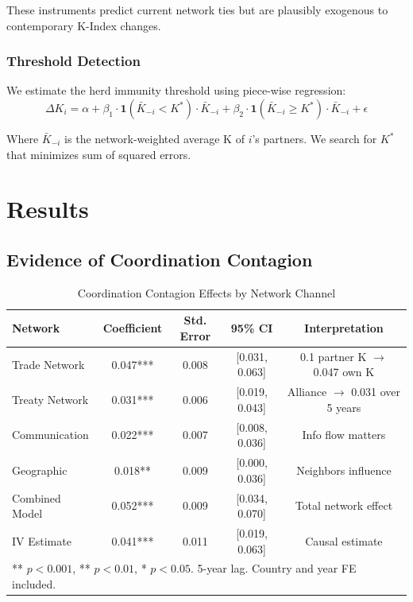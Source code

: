 \documentclass[12pt,a4paper]{article}
\begin{document}
These instruments predict current network ties but are plausibly exogenous to contemporary K-Index changes.

\subsubsection{Threshold Detection}

We estimate the herd immunity threshold using piece-wise regression:
\begin{equation}
\Delta K_i = \alpha + \beta_1 \cdot \mathbf{1}(\bar{K}_{-i} < K^*) \cdot \bar{K}_{-i} + \beta_2 \cdot \mathbf{1}(\bar{K}_{-i} \geq K^*) \cdot \bar{K}_{-i} + \epsilon
\end{equation}

Where $\bar{K}_{-i}$ is the network-weighted average K of $i$'s partners. We search for $K^*$ that minimizes sum of squared errors.

\section{Results}
\label{sec:results}

\subsection{Evidence of Coordination Contagion}

\begin{table}[H]
\centering
\caption{Coordination Contagion Effects by Network Channel}
\label{tab:contagion}
\begin{tabular}{lcccc}
\toprule
\textbf{Network} & \textbf{Coefficient} & \textbf{Std. Error} & \textbf{95\% CI} & \textbf{Interpretation} \\
\midrule
Trade Network & 0.047*** & 0.008 & [0.031, 0.063] & 0.1 partner K $\to$ 0.047 own K \\
Treaty Network & 0.031*** & 0.006 & [0.019, 0.043] & Alliance $\to$ 0.031 over 5 years \\
Communication & 0.022*** & 0.007 & [0.008, 0.036] & Info flow matters \\
Geographic & 0.018** & 0.009 & [0.000, 0.036] & Neighbors influence \\
\midrule
Combined Model & 0.052*** & 0.009 & [0.034, 0.070] & Total network effect \\
IV Estimate & 0.041*** & 0.011 & [0.019, 0.063] & Causal estimate \\
\bottomrule
\multicolumn{5}{l}{\small *** $p < 0.001$, ** $p < 0.01$, * $p < 0.05$. 5-year lag. Country and year FE included.}
\end{tabular}
\end{table}
\end{document}
